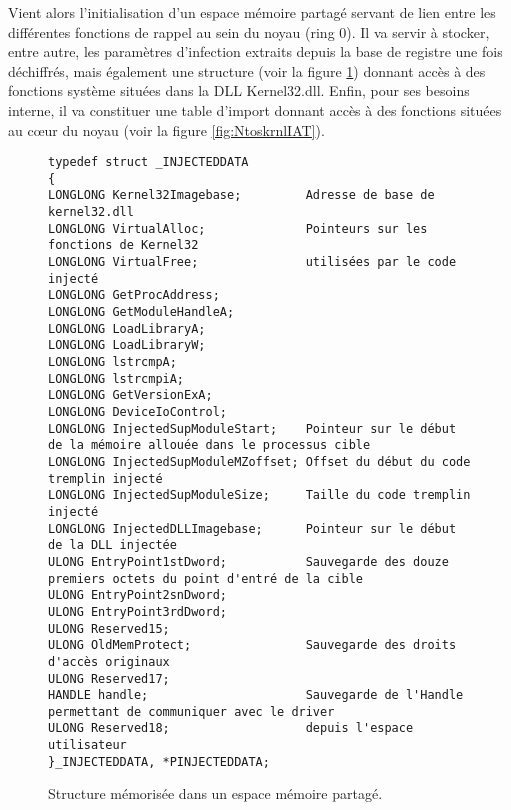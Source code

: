 \documentclass[times,11pt,fullpage]{article}
\begin{document}
Vient alors l'initialisation d'un espace mémoire partagé servant de lien entre les différentes fonctions de rappel au sein du noyau (ring 0). Il va servir à stocker, entre autre, les paramètres d'infection extraits depuis la base de registre une fois déchiffrés, mais également une structure (voir la figure \ref{fig:InjectedDataStruct}) donnant accès à des fonctions système situées dans la DLL Kernel32.dll. Enfin, pour ses besoins interne, il va constituer une table d'import donnant accès à des fonctions situées au c\oe ur du noyau (voir la figure \ref{fig:NtoskrnlIAT}).
\begin{figure}
\begin{framed}
\scriptsize
\begin{verbatim}
typedef struct _INJECTEDDATA  
{ 
LONGLONG Kernel32Imagebase;         Adresse de base de kernel32.dll
LONGLONG VirtualAlloc;              Pointeurs sur les fonctions de Kernel32 
LONGLONG VirtualFree;               utilisées par le code injecté
LONGLONG GetProcAddress;   
LONGLONG GetModuleHandleA; 
LONGLONG LoadLibraryA;      
LONGLONG LoadLibraryW;     
LONGLONG lstrcmpA;         
LONGLONG lstrcmpiA;        
LONGLONG GetVersionExA;    
LONGLONG DeviceIoControl;  
LONGLONG InjectedSupModuleStart;    Pointeur sur le début de la mémoire allouée dans le processus cible
LONGLONG InjectedSupModuleMZoffset; Offset du début du code tremplin injecté
LONGLONG InjectedSupModuleSize;     Taille du code tremplin injecté
LONGLONG InjectedDLLImagebase;      Pointeur sur le début de la DLL injectée             
ULONG EntryPoint1stDword;           Sauvegarde des douze premiers octets du point d'entré de la cible
ULONG EntryPoint2snDword;  
ULONG EntryPoint3rdDword;  
ULONG Reserved15;                   
ULONG OldMemProtect;                Sauvegarde des droits d'accès originaux
ULONG Reserved17;                   
HANDLE handle;                      Sauvegarde de l'Handle permettant de communiquer avec le driver 
ULONG Reserved18;                   depuis l'espace utilisateur
}_INJECTEDDATA, *PINJECTEDDATA;
\end{verbatim}
\end{framed}
\caption{Structure mémorisée dans un espace mémoire partagé.\label{fig:InjectedDataStruct}}
\end{figure}
  
\end{document}
